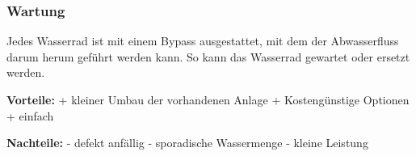\subsubsection{Wartung}
Jedes Wasserrad ist mit einem Bypass ausgestattet, mit dem der Abwasserfluss darum herum geführt werden kann. So kann das Wasserrad gewartet oder ersetzt werden.
\bigskip

\textbf{Vorteile:}												\newline
+	kleiner Umbau der vorhandenen Anlage			\newline
+	Kostengünstige Optionen								\newline
+	einfach															\newline
	
\textbf{Nachteile:}												\newline
- 	defekt anfällig												\newline
-	sporadische Wassermenge							\newline
-	kleine Leistung														\newline


